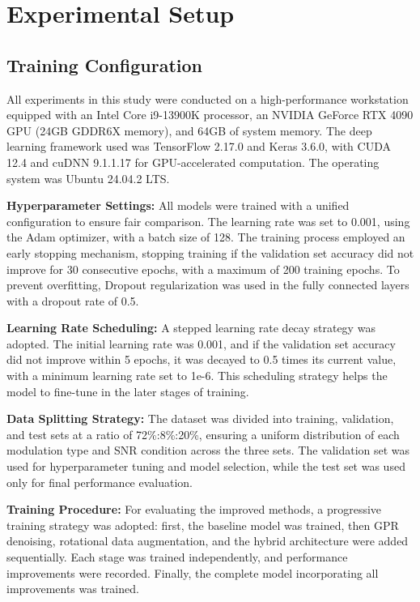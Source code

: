 \documentclass[conference]{IEEEtran}
\begin{document}
\section{Experimental Setup}

\subsection{Training Configuration}

All experiments in this study were conducted on a high-performance workstation equipped with an Intel Core i9-13900K processor, an NVIDIA GeForce RTX 4090 GPU (24GB GDDR6X memory), and 64GB of system memory. The deep learning framework used was TensorFlow 2.17.0 and Keras 3.6.0, with CUDA 12.4 and cuDNN 9.1.1.17 for GPU-accelerated computation. The operating system was Ubuntu 24.04.2 LTS.

\textbf{Hyperparameter Settings:}
All models were trained with a unified configuration to ensure fair comparison. The learning rate was set to 0.001, using the Adam optimizer, with a batch size of 128. The training process employed an early stopping mechanism, stopping training if the validation set accuracy did not improve for 30 consecutive epochs, with a maximum of 200 training epochs. To prevent overfitting, Dropout regularization was used in the fully connected layers with a dropout rate of 0.5.

\textbf{Learning Rate Scheduling:}
A stepped learning rate decay strategy was adopted. The initial learning rate was 0.001, and if the validation set accuracy did not improve within 5 epochs, it was decayed to 0.5 times its current value, with a minimum learning rate set to 1e-6. This scheduling strategy helps the model to fine-tune in the later stages of training.

\textbf{Data Splitting Strategy:}
The dataset was divided into training, validation, and test sets at a ratio of 72\%:8\%:20\%, ensuring a uniform distribution of each modulation type and SNR condition across the three sets. The validation set was used for hyperparameter tuning and model selection, while the test set was used only for final performance evaluation.

\textbf{Training Procedure:}
For evaluating the improved methods, a progressive training strategy was adopted: first, the baseline model was trained, then GPR denoising, rotational data augmentation, and the hybrid architecture were added sequentially. Each stage was trained independently, and performance improvements were recorded. Finally, the complete model incorporating all improvements was trained.
\end{document}
